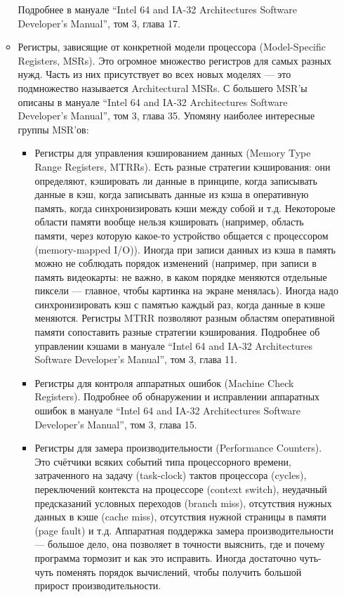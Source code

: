 \documentclass[11pt]{book}
\begin{document}
\begin{itemize}
\begin{itemize}
    Подробнее в мануале ``Intel 64 and IA-32 Architectures Software Developer's Manual'', том 3, глава 17.
    \item Регистры, зависящие от конкретной модели процессора (Model-Specific Registers, MSRs).
    Это огромное множество регистров для самых разных нужд.
    Часть из них присутствует во всех новых моделях --- это подмножество называется Architectural MSRs.
    С большего MSR'ы описаны в мануале ``Intel 64 and IA-32 Architectures Software Developer's Manual'', том 3, глава 35.
    Упомяну наиболее интересные группы MSR'ов:
        \begin{itemize}
        \item Регистры для управления кэшированием данных (Memory Type Range Registers, MTRRs).
        Есть разные стратегии кэширования: они определяют, кэшировать ли данные в принципе,
        когда записывать данные в кэш, когда записывать данные из кэша в оперативную память,
        когда синхронизировать кэши между собой и т.д.
        Некотороые области памяти вообще нельзя кэшировать (например, область памяти, через которую какое-то устройство общается с процессором (memory-mapped I/O)).
        Иногда при записи данных из кэша в память можно не соблюдать порядок изменений
        (например, при записи в память видеокарты: не важно, в каком порядке меняются отдельные пиксели --- главное, чтобы картинка на экране менялась).
        Иногда надо синхронизировать кэш с памятью каждый раз, когда данные в кэше меняются.
        Регистры MTRR позволяют разным областям оперативной памяти сопоставить разные стратегии кэширования.
        Подробнее об управлении кэшами в мануале ``Intel 64 and IA-32 Architectures Software Developer's Manual'', том 3, глава 11.
        \item Регистры для контроля аппаратных ошибок (Machine Check Registers).
        Подробнее об обнаружении и исправлении аппаратных ошибок в мануале ``Intel 64 and IA-32 Architectures Software Developer's Manual'', том 3, глава 15.
        \item Регистры для замера производительности (Performance Counters).
        Это счётчики всяких событий типа
        процессорного времени, затраченного на задачу (task-clock)
        тактов процессора (cycles),
        переключений контекста на процессоре (context switch),
        неудачный предсказаний условных переходов (branch miss),
        отсутствия нужных данных в кэше (cache miss),
        отсутствия нужной страницы в памяти (page fault)
        и т.д.
        Аппаратная поддержка замера производительности --- большое дело, она позволяет в точности выяснить,
        где и почему программа тормозит и как это исправить. Иногда достаточно чуть-чуть поменять порядок вычислений,
        чтобы получить большой прирост производительности.
        \end{itemize}
    \end{itemize}
\end{itemize}
\end{document}
